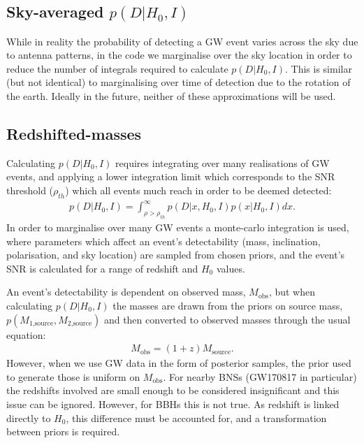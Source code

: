 \documentclass[a4paper,10pt]{article}
\begin{document}
\subsection{Sky-averaged \boldmath$p(D|H_0,I)$}
While in reality the probability of detecting a GW event varies across the sky due to antenna patterns, in the code we marginalise over the sky location in order to reduce the number of integrals required to calculate $p(D|H_0,I)$.  This is similar (but not identical) to marginalising over time of detection due to the rotation of the earth.  Ideally in the future, neither of these approximations will be used.


\subsection{Redshifted-masses}
Calculating $p(D|H_0,I)$ requires integrating over many realisations of GW events, and applying a lower integration limit which corresponds to the SNR threshold ($\rho_{th}$) which all events much reach in order to be deemed detected:
\begin{equation}
\begin{aligned}
p(D|H_0,I) = \int_{\rho>\rho_{th}}^\infty p(D|x,H_0,I)p(x|H_0,I)dx.
\end{aligned}
\end{equation}
In order to marginalise over many GW events a monte-carlo integration is used, where parameters which affect an event's detectability (mass, inclination, polarisation, and sky location) are sampled from chosen priors, and the event's SNR is calculated for a range of redshift and $H_0$ values.

An event's detectability is dependent on observed mass, $M_{\text{obs}}$, but when calculating $p(D|H_0,I)$ the masses are drawn from the priors on source mass, $p(M_{\text{1,source}},M_{\text{2,source}})$ and then converted to observed masses through the usual equation:
\begin{equation}
\begin{aligned}
M_{\text{obs}} = (1+z)M_{\text{source}}.
\end{aligned}
\end{equation}
However, when we use GW data in the form of posterior samples, the prior used to generate those is uniform on $M_{\text{obs}}$.  For nearby BNSs (GW170817 in particular) the redshifts involved are small enough to be considered insignificant and this issue can be ignored.  However, for BBHs this is not true.  As redshift is linked directly to $H_0$, this difference must be accounted for, and a transformation between priors is required.
\end{document}
